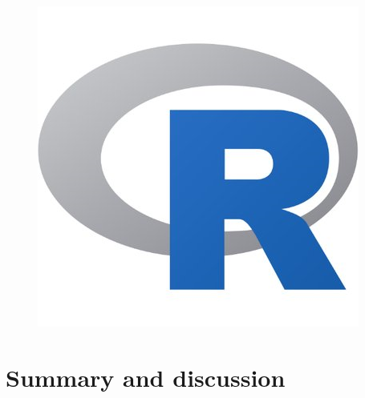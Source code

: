 \documentclass[article]{jss}
\begin{document}
\begin{figure}[H]
{    \includegraphics[scale = 0.5, keepaspectratio=true]{Figures/gridDB.png}
  } 
\end{figure}






\section{Summary and discussion} \label{sec:summary}
\end{document}
